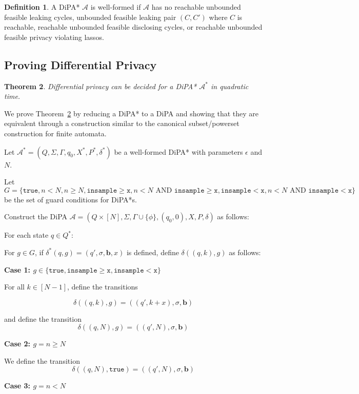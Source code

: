 \documentclass[12pt]{article}
\newcommand{\gguard}{\texttt{insample}\geq \texttt{x}}
\newcommand{\lguard}{\texttt{insample} < \texttt{x}}
\newcommand{\gaguard}{n<N \text{ AND } \texttt{insample} \geq \texttt{x}}
\newcommand{\laguard}{n<N\text{ AND }\texttt{insample} < \texttt{x}}
\newtheorem{thm}{Theorem}[section]
\theoremstyle{definition}
\newtheorem{defn}[thm]{Definition}
\begin{document}
\begin{defn} 
	A DiPA* $\mathcal{A}$ is well-formed if $\mathcal{A}$ has no reachable unbounded feasible leaking cycles, unbounded feasible leaking pair $(C, C')$ where $C$ is reachable, reachable unbounded feasible disclosing cycles, or reachable unbounded feasible privacy violating lassos.
\end{defn}




\subsection{Proving Differential Privacy}

\begin{thm}\label{DPtheorem}
	Differential privacy can be decided for a DiPA* $\mathcal{A}^*$ in quadratic time.
\end{thm}



We prove Theorem~\ref{DPtheorem} by reducing a DiPA* to a DiPA and showing that they are equivalent through a construction similar to the canonical subset/powerset construction for finite automata.

Let $\mathcal{A}^* = (Q, \Sigma, \Gamma, q_0, X^*, P^*, \delta^*)$ be a well-formed DiPA* with parameters $\epsilon$ and $N$. 

Let $G = \{\texttt{true}, n<N, n\geq N, \gguard, \gaguard, \lguard,\laguard \}$ be the set of guard conditions for DiPA*s.

Construct the DiPA $\mathcal{A} = (Q \times [N], \Sigma, \Gamma\cup \{\phi\}, (q_0, 0), X, P, \delta)$ as follows:

For each state $q \in Q^*$:

For $g\in G$, if $\delta^*(q, g) = (q', \sigma, \mathbf{b}, x)$ is defined, define $\delta((q, k), g)$ as follows:

\textbf{Case 1: $g \in \{\texttt{true}, \gguard, \lguard\}$}

For all $k \in [N-1]$, define the transitions

\[
	\delta((q, k), g) = ((q', k+x), \sigma, \mathbf{b})	
\]

and define the transition
\[
	\delta((q, N), g) = ((q', N), \sigma, \mathbf{b})	
\]

\textbf{Case 2: $g = n \geq N$}

We define the transition 
\[
	\delta((q, N), \texttt{true}) = ((q', N), \sigma, \mathbf{b})
\]

\textbf{Case 3: $g = n < N$}
\end{document}
